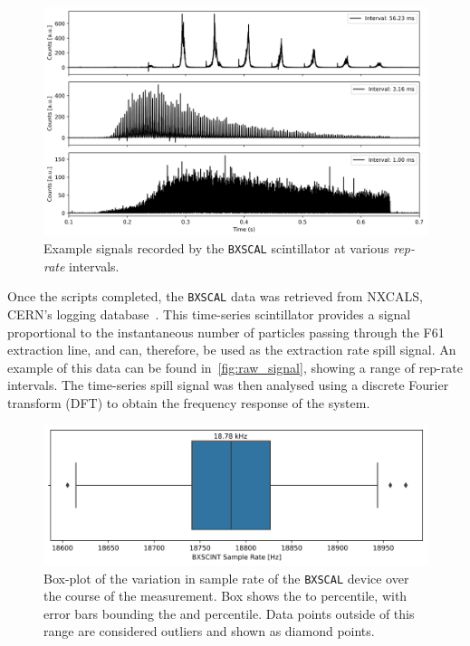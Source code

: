 \documentclass[a4paper,twoside,11pt]{report}
\begin{document}
\begin{figure}
  \centering
  \includegraphics*[width=0.7\linewidth]{raw_signal.png}
  \cprotect\caption{Example signals recorded by the \verb|BXSCAL| scintillator at various \textit{rep-rate} intervals.}\label{fig:raw_signal}
\end{figure}

Once the scripts completed, the \verb|BXSCAL| data was retrieved from NXCALS, CERN's logging database~\cite{nxcals}. This time-series scintillator provides a signal proportional to the instantaneous number of particles passing through the F61 extraction line, and can, therefore, be used as the extraction rate spill signal. An example of this data can be found in~\autoref{fig:raw_signal}, showing a range of rep-rate intervals. The time-series spill signal was then analysed using a discrete Fourier transform (DFT) to obtain the frequency response of the system. 


\begin{figure}
  \centering
  \includegraphics*[width=0.8\linewidth]{sample_rate_variation.png}
  \caption[Sample rate variation of the \texttt{BXSCAL} scintillator device]{Box-plot of the variation in sample rate of the \texttt{BXSCAL} device over the course of the measurement. Box shows the  to  percentile, with error bars bounding the  and  percentile. Data points outside of this range are considered outliers and shown as diamond points.}\label{fig:sample_rate_variation}
\end{figure}
\end{document}
